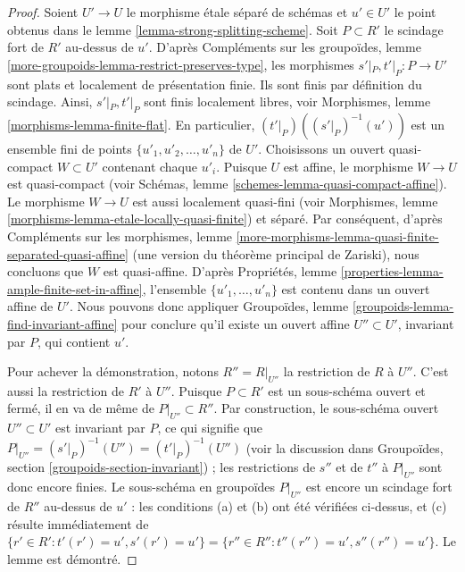 \begin{proof}
Soient $U' \to U$ le morphisme \'etale séparé de schémas et $u' \in U'$ le point
obtenus dans le lemme \ref{lemma-strong-splitting-scheme}.
Soit $P \subset R'$ le scindage fort de $R'$ au-dessus de $u'$. D'après
Compléments sur les groupoïdes, lemme \ref{more-groupoids-lemma-restrict-preserves-type},
les morphismes $s'|_P, t'|_P : P \to U'$ sont plats et localement de présentation finie.
Ils sont finis par définition du scindage. Ainsi, $s'|_P, t'|_P$ sont finis
localement libres, voir
Morphismes, lemme \ref{morphisms-lemma-finite-flat}.
En particulier, $(t'|_P)((s'|_P)^{-1}(u'))$ est un ensemble fini de points
$\{u'_1, u'_2, \ldots, u'_n\}$ de $U'$. Choisissons un ouvert quasi-compact
$W \subset U'$ contenant chaque $u'_i$. Puisque $U$ est affine, le morphisme
$W \to U$ est quasi-compact (voir
Schémas, lemme \ref{schemes-lemma-quasi-compact-affine}).
Le morphisme $W \to U$ est aussi localement quasi-fini (voir
Morphismes, lemme \ref{morphisms-lemma-etale-locally-quasi-finite})
et séparé. Par conséquent, d'après
Compléments sur les morphismes,
lemme \ref{more-morphisms-lemma-quasi-finite-separated-quasi-affine}
(une version du théorème principal de Zariski),
nous concluons que $W$ est quasi-affine. D'après
Propriétés, lemme \ref{properties-lemma-ample-finite-set-in-affine},
l'ensemble $\{u'_1, \ldots, u'_n\}$ est contenu dans un ouvert affine
de $U'$. Nous pouvons donc appliquer
Groupoïdes, lemme \ref{groupoids-lemma-find-invariant-affine}
pour conclure qu'il existe un ouvert affine $U'' \subset U'$, invariant par
$P$, qui contient $u'$.

\medskip\noindent
Pour achever la démonstration, notons $R'' = R|_{U''}$ la restriction de $R$
à $U''$. C'est aussi la restriction de $R'$ à $U''$.
Puisque $P \subset R'$ est un sous-schéma ouvert et fermé, il en va de même de
$P|_{U''} \subset R''$. Par construction, le sous-schéma ouvert $U'' \subset U'$
est invariant par $P$, ce qui signifie que
$P|_{U''} = (s'|_P)^{-1}(U'') = (t'|_P)^{-1}(U'')$
(voir la discussion dans
Groupoïdes, section \ref{groupoids-section-invariant}) ;
les restrictions de $s''$ et de $t''$ à $P|_{U''}$ sont donc encore finies.
Le sous-schéma en groupoïdes $P|_{U''}$ est encore un scindage fort de
$R''$ au-dessus de $u'$ : les conditions (a) et (b) ont été vérifiées ci-dessus,
et (c) résulte immédiatement de $\{r' \in R': t'(r') = u', s'(r') = u'\} =
\{r'' \in R'': t''(r'') = u', s''(r'') = u'\}$.
Le lemme est démontré.
\end{proof}

